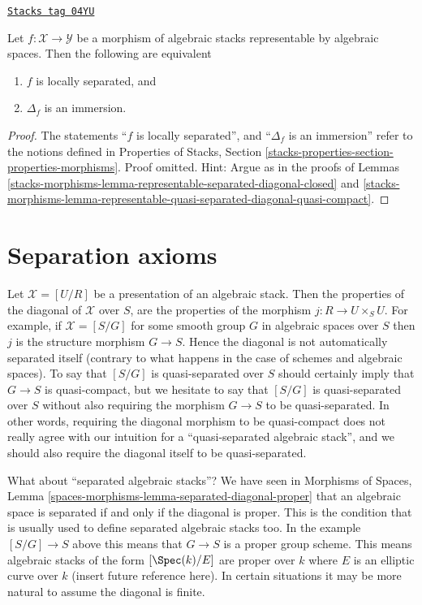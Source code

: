 \begin{lemma}
\label{stacks-morphisms-lemma-representable-locally-separated-diagonal-immersion}
\href{https://stacks.math.columbia.edu/tag/04YU}{\texttt{Stacks tag 04YU}}

Let $f : \mathcal{X} \to \mathcal{Y}$ be a morphism of algebraic stacks
representable by algebraic spaces. Then the following are equivalent
\begin{enumerate}
\item $f$ is locally separated, and
\item $\Delta_f$ is an immersion.
\end{enumerate}
\end{lemma}

\begin{proof}
The statements ``$f$ is locally separated'', and ``$\Delta_f$ is an immersion''
refer to the notions defined in
Properties of Stacks,
Section \ref{stacks-properties-section-properties-morphisms}.
Proof omitted. Hint: Argue as in the proofs of
Lemmas \ref{stacks-morphisms-lemma-representable-separated-diagonal-closed} and
\ref{stacks-morphisms-lemma-representable-quasi-separated-diagonal-quasi-compact}.
\end{proof}

\section{Separation axioms}
\label{stacks-morphisms-section-separated}
Let $\mathcal{X} = [U/R]$ be a presentation of an algebraic stack.
Then the properties of the diagonal of $\mathcal{X}$ over $S$, are
the properties of the morphism $j : R \to U \times_S U$. For example,
if $\mathcal{X} = [S/G]$ for some smooth group $G$ in algebraic spaces
over $S$ then $j$ is the structure morphism $G \to S$. Hence the diagonal
is not automatically separated itself (contrary to what happens in the
case of schemes and algebraic spaces). To say that $[S/G]$ is quasi-separated
over $S$ should certainly imply that $G \to S$ is quasi-compact, but we
hesitate to say that $[S/G]$ is quasi-separated over $S$ without also
requiring the morphism $G \to S$ to be quasi-separated. In other words,
requiring the diagonal morphism to be quasi-compact does not really agree
with our intuition for a ``quasi-separated algebraic stack'', and we should
also require the diagonal itself to be quasi-separated.

\medskip\noindent
What about ``separated algebraic stacks''? We have seen in
Morphisms of Spaces,
Lemma \ref{spaces-morphisms-lemma-separated-diagonal-proper}
that an algebraic space is separated if and only if the diagonal is proper.
This is the condition that is usually used to define separated algebraic
stacks too. In the example $[S/G] \to S$ above this means that $G \to S$
is a proper group scheme. This means algebraic stacks of the form
$[\Spec(k)/E]$ are proper over $k$ where $E$ is an elliptic curve
over $k$ (insert future reference here). In certain situations it may be
more natural to assume the diagonal is finite.

